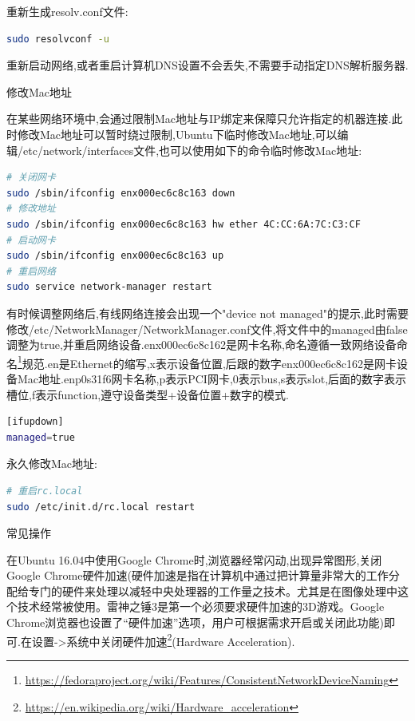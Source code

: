 \documentclass[12pt]{book}
\makeatletter
\numberwithin{dummy}{section}
\theoremstyle{ocrenumbox}
\theoremstyle{blacknumex}
\theoremstyle{blacknumbox}
\theoremstyle{ocrenum}
\renewcommand{\section}{\@startsection{section}{1}{\z@}
	{-4ex \@plus -1ex \@minus -.4ex}
	{1ex \@plus.2ex }
	{\normalfont\large\sffamily\bfseries}}
\renewcommand{\subsection}{\@startsection {subsection}{2}{\z@}
	{-3ex \@plus -0.1ex \@minus -.4ex}
	{0.5ex \@plus.2ex }
	{\normalfont\sffamily\bfseries}}
\makeatother
\begin{document}
重新生成resolv.conf文件:

\begin{lstlisting}[language=Bash]
sudo resolvconf -u
\end{lstlisting}

重新启动网络,或者重启计算机DNS设置不会丢失,不需要手动指定DNS解析服务器.

\subsection{修改Mac地址}

在某些网络环境中,会通过限制Mac地址与IP绑定来保障只允许指定的机器连接.此时修改Mac地址可以暂时绕过限制,Ubuntu下临时修改Mac地址,可以编辑/etc/network/interfaces文件,也可以使用如下的命令临时修改Mac地址:

\begin{lstlisting}[language=Bash]
# 关闭网卡
sudo /sbin/ifconfig enx000ec6c8c163 down
# 修改地址
sudo /sbin/ifconfig enx000ec6c8c163 hw ether 4C:CC:6A:7C:C3:CF
# 启动网卡
sudo /sbin/ifconfig enx000ec6c8c163 up
# 重启网络
sudo service network-manager restart
\end{lstlisting}

有时候调整网络后,有线网络连接会出现一个"device not managed"的提示,此时需要修改/etc/NetworkManager/NetworkManager.conf文件,将文件中的managed由false调整为true,并重启网络设备.enx000ec6c8c162是网卡名称,命名遵循一致网络设备命名\footnote{\url{https://fedoraproject.org/wiki/Features/ConsistentNetworkDeviceNaming}}规范.en是Ethernet的缩写,x表示设备位置,后跟的数字enx000ec6c8c162是网卡设备Mac地址.enp0s31f6网卡名称,p表示PCI网卡,0表示bus,s表示slot,后面的数字表示槽位,f表示function,遵守设备类型+设备位置+数字的模式.

\begin{lstlisting}[language=Bash]
[ifupdown]
managed=true
\end{lstlisting}

永久修改Mac地址:

\begin{lstlisting}[language=Bash]
# 重启rc.local
sudo /etc/init.d/rc.local restart
\end{lstlisting}



\section{常见操作}

在Ubuntu 16.04中使用Google Chrome时,浏览器经常闪动,出现异常图形,关闭Google Chrome硬件加速(硬件加速是指在计算机中通过把计算量非常大的工作分配给专门的硬件来处理以减轻中央处理器的工作量之技术。尤其是在图像处理中这个技术经常被使用。雷神之锤3是第一个必须要求硬件加速的3D游戏。Google Chrome浏览器也设置了“硬件加速”选项，用户可根据需求开启或关闭此功能)即可.在设置->系统中关闭硬件加速\footnote{\url{https://en.wikipedia.org/wiki/Hardware_acceleration}}(Hardware Acceleration).
\end{document}
